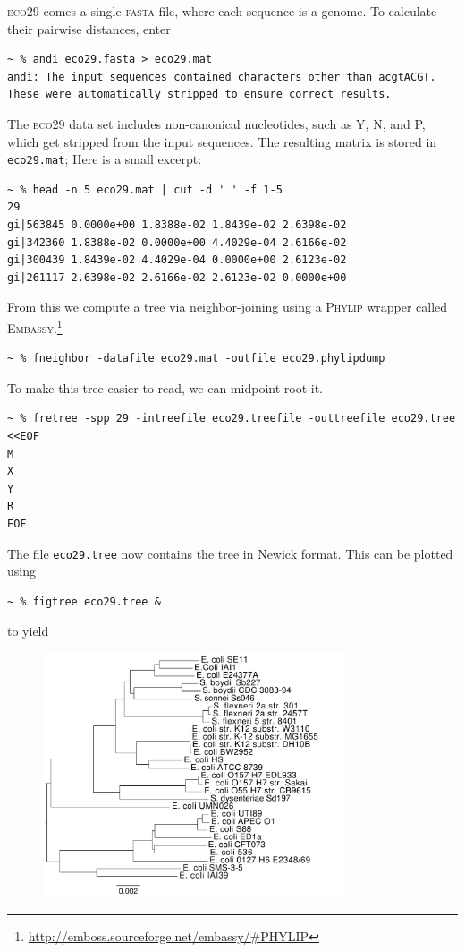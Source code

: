 \documentclass[a4paper,
  10pt,
  english,
  DIV=12,
  BCOR=8mm]{scrbook}
\newcommand{\algo}[1]{\textsc{{#1}}}
\newcommand{\word}[1]{\textsf{\small#1}}
\begin{document}
\algo{eco29} comes a single \algo{fasta} file, where each sequence is a genome. To calculate their pairwise distances, enter

\begin{lstlisting}
~ % andi eco29.fasta > eco29.mat
andi: The input sequences contained characters other than acgtACGT. These were automatically stripped to ensure correct results.
\end{lstlisting}

\noindent The \algo{eco29} data set includes non-canonical nucleotides, such as \word{Y}, \word{N}, and \word{P}, which get stripped from the input sequences. The resulting matrix is stored in \lstinline$eco29.mat$; Here is a small excerpt:

\begin{lstlisting}
~ % head -n 5 eco29.mat | cut -d ' ' -f 1-5
29
gi|563845 0.0000e+00 1.8388e-02 1.8439e-02 2.6398e-02
gi|342360 1.8388e-02 0.0000e+00 4.4029e-04 2.6166e-02
gi|300439 1.8439e-02 4.4029e-04 0.0000e+00 2.6123e-02
gi|261117 2.6398e-02 2.6166e-02 2.6123e-02 0.0000e+00
\end{lstlisting}

\noindent From this we compute a tree via neighbor-joining using a \algo{Phylip} wrapper called \algo{Embassy}.\footnote{\url{http://emboss.sourceforge.net/embassy/\#PHYLIP}}

\begin{lstlisting}
~ % fneighbor -datafile eco29.mat -outfile eco29.phylipdump
\end{lstlisting}
\noindent To make this tree easier to read, we can midpoint-root it.
\begin{lstlisting}
~ % fretree -spp 29 -intreefile eco29.treefile -outtreefile eco29.tree <<EOF
M
X
Y
R
EOF
\end{lstlisting}

\noindent The file \lstinline$eco29.tree$ now contains the tree in Newick format. This can be plotted using \cite{figtree}

\begin{lstlisting}
~ % figtree eco29.tree &
\end{lstlisting}

\noindent to yield

\begin{figure}[h]
  \centering\includegraphics[width=0.8\textwidth]{andi_labels.pdf}
\end{figure}
\end{document}
